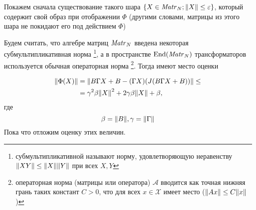 Покажем сначала существование такого шара \( \{ X\in\mathit{Matr}_{N} {}; {\left\|{X}\right\|} \leq \varepsilon \} \),
который содержит свой образ при отображении \( \Phi \)
(другими словами, матрицы из этого шара
 не покидают его под действием \( \Phi \))

Будем считать, что алгебре матриц \( \mathit{Matr}_{N} {} \)
введена некоторая субмультипликативная норма
\footnote{субмультипликативной называют норму, удовлетворяющую неравенству \( {\left\|{XY}\right\|}\leq {\left\|{X}\right\|}{\left\|{Y}\right\|} \) при всех \( X, Y \) },
а в пространстве \( \mathrm{End}({\mathit{Matr}_{N} {}}) \) трансформаторов
используется обычная операторная норма%
\footnote{операторная норма
(матрицы или оператора) \( \mathcal A \)
вводится как точная нижняя грань таких констант \( C > 0 \),
что для всех \( x\in\mathscr X\) имеет место
(\( {\left\|{A x}\right\|} \leq C {\left\|{x}\right\|} \))}.
Тогда имеют место оценки

\begin{align*}
    {\left\|{\Phi(X)}\right\|} &= {\left\|{B \Gamma X + B - (\Gamma X) (J(B\Gamma X + B))}\right\|} \leq \\
    &= \gamma^2\beta{\left\|{X}\right\|}^2 + 2\gamma\beta{\left\|{X}\right\|} + \beta,
\end{align*}
где \[ \beta={\left\|{B}\right\|}, \gamma={\left\|{\Gamma}\right\|} \]
Пока что отложим оценку этих величин.


